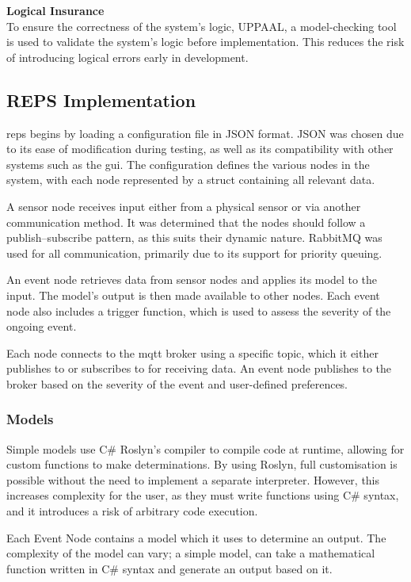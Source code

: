 	
		\noindent
		\textbf{Logical Insurance}\\
		To ensure the correctness of the system's logic, UPPAAL, a model-checking tool is used to validate the system's logic before implementation. This reduces the risk of introducing logical errors early in development.\\
	\subsection{REPS Implementation}\label{Reps:Imp}
		\gls{reps} begins by loading a configuration file in JSON format. JSON was chosen due to its ease of modification during testing, as well as its compatibility with other systems such as the \gls{gui}. The configuration defines the various nodes in the system, with each node represented by a struct containing all relevant data.
		
		A sensor node receives input either from a physical sensor or via another communication method. It was determined that the nodes should follow a publish–subscribe pattern, as this suits their dynamic nature. RabbitMQ was used for all communication, primarily due to its support for priority queuing.
		
		An event node retrieves data from sensor nodes and applies its model to the input. The model's output is then made available to other nodes. Each event node also includes a trigger function, which is used to assess the severity of the ongoing event.

		Each node connects to the \gls{mqtt} broker using a specific topic, which it either publishes to or subscribes to for receiving data. An event node publishes to the broker based on the severity of the event and user-defined preferences.
		
	
	\subsubsection{Models}
		Simple models use C\# Roslyn's compiler to compile code at runtime, allowing for custom functions to make determinations. By using Roslyn, full customisation is possible without the need to implement a separate interpreter. However, this increases complexity for the user, as they must write functions using C\# syntax, and it introduces a risk of arbitrary code execution.
	
		Each Event Node contains a model which it uses to determine an output. The complexity of the model can vary; a simple model, can take a mathematical function written in C\# syntax and generate an output based on it.
	
